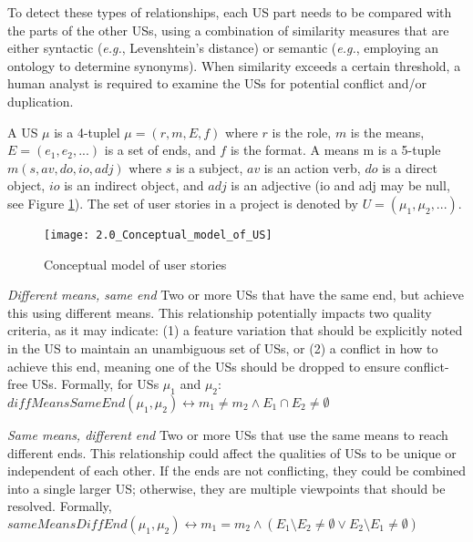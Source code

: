 To detect these types of relationships, each US part needs to be compared with the parts of the other USs, using a combination of similarity measures that are either syntactic (\emph{e.g.}, Levenshtein’s distance) or semantic (\emph{e.g.}, employing an ontology to determine synonyms). When similarity exceeds a certain threshold, a human analyst is required to examine the USs for potential conflict and/or duplication.
\begin{definition}
A US $\mu$ is a 4-tuplel $\mu=(r,m,E,f)$ where $r$ is the role, $m$ is the means, $E=(e_1, e_2, . . .)$ is a set of ends, and $f$ is the format. A means m is a 5-tuple $m (s,av,do,io,adj)$ where $s$ is a subject, $av$ is an action verb, $do$ is a direct object, $io$ is an indirect object, and $adj$ is an adjective (io and adj may be null, see Figure \ref{fig:conceptual_model}). The set of user stories in a project is denoted by $U=(\mu_1, \mu_2, . . .)$.
\end{definition}
\begin{figure}
\center
\texttt{[image: 2.0\_Conceptual\_model\_of\_US]}
\caption{Conceptual model of user stories \cite{lucassen2016improving}}\label{fig:conceptual_model}
\end{figure}
\begin{definition}
\emph{Different means, same end }Two or more USs that have the same end, but achieve this using different means. This relationship potentially impacts two quality criteria, as it may indicate: (1) a feature variation that should be explicitly noted in the US to maintain an unambiguous set of USs, or (2) a conflict in how to achieve this end, meaning one of the USs should be dropped to ensure conflict-free USs. Formally, for USs $\mu_1$ and $\mu_2$:\\ 
$diffMeansSameEnd(\mu_1,\mu_2)\leftrightarrow m_1 \neq m_2 \wedge E_1 \cap E_2 \neq \emptyset$
\end{definition}
\begin{definition}
\emph{Same means, different end} Two or more USs that use the same means to reach different ends. This relationship could affect the qualities of USs to be unique or independent of each other. If the ends are not conflicting, they could be combined into a single larger US; otherwise, they are multiple viewpoints that should be resolved. Formally,\\ 
$sameMeansDiffEnd(\mu_1, \mu_2) \leftrightarrow m_1 = m_2 \wedge (E_1 \setminus E_2 \neq \emptyset \vee E_2 \setminus E_1 \neq \emptyset )$
\end{definition}
